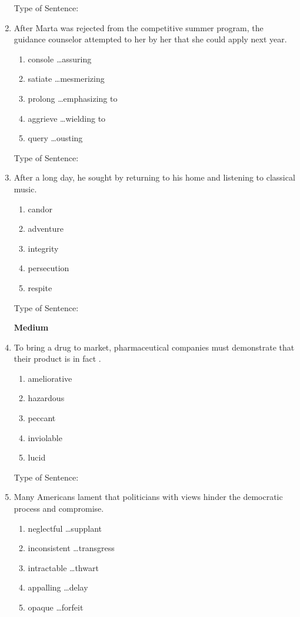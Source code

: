 \begin{enumerate}
Type of Sentence:\hrulefill

\bigskip
\item\sloppy After Marta was rejected from the competitive summer program, the guidance counselor attempted to \longline her by \longline her that she could apply next year. 
\begin{enumerate}[label=(\Alph*)]
\item console \ldots assuring
\item satiate \ldots mesmerizing
\item prolong \ldots emphasizing to
\item aggrieve \ldots wielding to 
\item query \ldots ousting 
\end{enumerate}

Type of Sentence:\hrulefill

\bigskip
\item After a long day, he sought \longline by returning to his home and listening to classical music. 
\begin{enumerate}[label=(\Alph*)]
\item candor
\item adventure
\item integrity
\item persecution
\item respite
\end{enumerate}

Type of Sentence:\hrulefill

\textbf{Medium}

\bigskip
\item To bring a drug to market, pharmaceutical companies must demonstrate that their product is in fact \longline.
\begin{enumerate}[label=(\Alph*)]
\item ameliorative
\item hazardous
\item peccant
\item inviolable 
\item lucid
\end{enumerate}

Type of Sentence:\hrulefill

\bigskip
\item Many Americans lament that politicians with \longline views hinder the democratic process and \longline compromise.
\begin{enumerate}[label=(\Alph*)]
\item neglectful \ldots supplant
\item inconsistent \ldots transgress
\item intractable \ldots thwart
\item appalling \ldots delay
\item opaque \ldots forfeit
\end{enumerate}


\end{enumerate}
